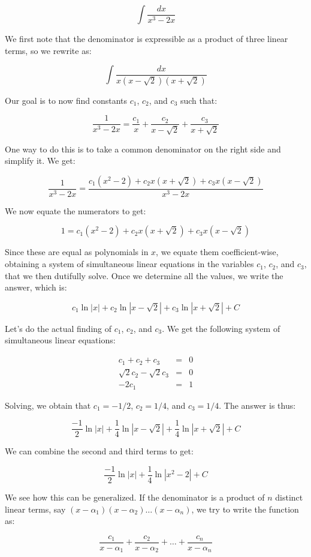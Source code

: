 \documentclass[10pt]{amsart}
\begin{document}
$$\int \frac{dx}{x^3 - 2x}$$

We first note that the denominator is expressible as a product of
three linear terms, so we rewrite as:

$$\int \frac{dx}{x(x - \sqrt{2})(x + \sqrt{2})}$$

Our goal is to now find constants $c_1$, $c_2$, and $c_3$ such that:

$$\frac{1}{x^3 - 2x} = \frac{c_1}{x} + \frac{c_2}{x - \sqrt{2}} + \frac{c_3}{x + \sqrt{2}}$$

One way to do this is to take a common denominator on the right side
and simplify it. We get:

$$\frac{1}{x^3 - 2x} = \frac{c_1(x^2 - 2) + c_2x(x + \sqrt{2}) + c_3x(x - \sqrt{2})}{x^3 - 2x}$$

We now equate the numerators to get:

$$1 = c_1(x^2 - 2) + c_2x(x + \sqrt{2}) + c_3x(x - \sqrt{2})$$

Since these are equal as polynomials in $x$, we equate them
coefficient-wise, obtaining a system of simultaneous linear equations
in the variables $c_1$, $c_2$, and $c_3$, that we then dutifully
solve. Once we determine all the values, we write the answer, which is:

$$c_1 \ln|x| + c_2 \ln|x - \sqrt{2}| + c_3 \ln|x + \sqrt{2}| + C$$

Let's do the actual finding of $c_1$, $c_2$, and $c_3$. We get the
following system of simultaneous linear equations:

\begin{eqnarray*}
  c_1 + c_2 + c_3 & = & 0 \\
  \sqrt{2} c_2 - \sqrt{2} c_3 & = & 0\\
  -2c_1 & = & 1 
\end{eqnarray*}

Solving, we obtain that $c_1 = -1/2$, $c_2 = 1/4$, and $c_3 =
1/4$. The answer is thus:

$$\frac{-1}{2} \ln|x| + \frac{1}{4} \ln|x - \sqrt{2}| + \frac{1}{4} \ln|x + \sqrt{2}| + C$$

We can combine the second and third terms to get:

$$\frac{-1}{2} \ln|x| + \frac{1}{4} \ln|x^2 - 2| + C$$

We see how this can be generalized. If the denominator is a product of
$n$ distinct linear terms, say $(x - \alpha_1)(x - \alpha_2) \dots (x
- \alpha_n)$, we try to write the function as:

$$\frac{c_1}{x - \alpha_1} + \frac{c_2}{x - \alpha_2} + \dots + \frac{c_n}{x - \alpha_n}$$
\end{document}

